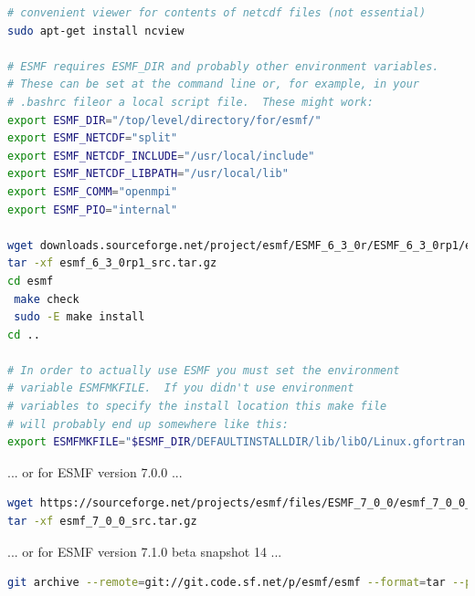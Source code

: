 \documentclass[11pt]{article}
\begin{document}
\begin{lstlisting}[language=bash]
# convenient viewer for contents of netcdf files (not essential)
sudo apt-get install ncview

# ESMF requires ESMF_DIR and probably other environment variables.  
# These can be set at the command line or, for example, in your 
# .bashrc fileor a local script file.  These might work:
export ESMF_DIR="/top/level/directory/for/esmf/"
export ESMF_NETCDF="split"
export ESMF_NETCDF_INCLUDE="/usr/local/include"
export ESMF_NETCDF_LIBPATH="/usr/local/lib"
export ESMF_COMM="openmpi"
export ESMF_PIO="internal"
                                                                                                              
wget downloads.sourceforge.net/project/esmf/ESMF_6_3_0r/ESMF_6_3_0rp1/esmf_6_3_0rp1_src.tar.gz
tar -xf esmf_6_3_0rp1_src.tar.gz
cd esmf 
 make check
 sudo -E make install
cd ..

# In order to actually use ESMF you must set the environment 
# variable ESMFMKFILE.  If you didn't use environment 
# variables to specify the install location this make file 
# will probably end up somewhere like this:
export ESMFMKFILE="$ESMF_DIR/DEFAULTINSTALLDIR/lib/libO/Linux.gfortran.64.openmpi.default/esmf.mk"

\end{lstlisting}
\vspace{10mm}
... or for ESMF version 7.0.0 ...
\begin{lstlisting}[language=bash]
wget https://sourceforge.net/projects/esmf/files/ESMF_7_0_0/esmf_7_0_0_src.tar.gz
tar -xf esmf_7_0_0_src.tar.gz 
\end{lstlisting}
\vspace{10mm}
... or for ESMF version 7.1.0 beta snapshot 14 ...
\begin{lstlisting}[language=bash]
git archive --remote=git://git.code.sf.net/p/esmf/esmf --format=tar --prefix=esmf/ ESMF_7_1_0_beta_snapshot_14 | tar xf -
\end{lstlisting}
\end{document}
